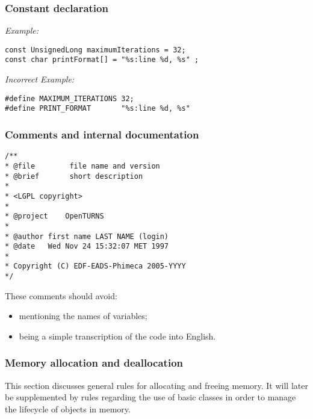 \subsubsection{Constant declaration}
\emph{Example:}
\begin{lstlisting}[frame=TBRL]
const UnsignedLong maximumIterations = 32;
const char printFormat[] = "%s:line %d, %s" ;
\end{lstlisting}
\emph{Incorrect Example:}
\begin{lstlisting}[frame=TBRL]
#define MAXIMUM_ITERATIONS 32;
#define PRINT_FORMAT       "%s:line %d, %s"
\end{lstlisting}

\subsubsection{Comments and internal documentation }
\lstset{language=C++, basicstyle=\normalsize}
\begin{lstlisting}[frame=TBRL]
/**
* @file        file name and version
* @brief       short description
*
* <LGPL copyright>
*
* @project    OpenTURNS
*
* @author first name LAST NAME (login)
* @date   Wed Nov 24 15:32:07 MET 1997
*
* Copyright (C) EDF-EADS-Phimeca 2005-YYYY
*/
\end{lstlisting}


These comments should avoid:
\begin{itemize}
\item mentioning the names of variables;
\item being a simple transcription of the code into English.
\end{itemize}


\subsubsection {Memory allocation and deallocation}
This section discusses general rules for allocating and freeing memory. It will later be supplemented by rules regarding the use of basic classes in order to manage the lifecycle of objects in memory.

